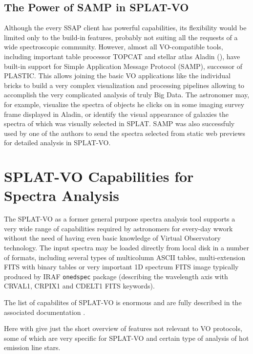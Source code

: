 \documentclass[final,authoryear,5p,times,twocolumn]{elsarticle}
\begin{document}

\subsection{The Power of SAMP in SPLAT-VO}

Although the every SSAP client has  powerful capabilities, its flexibility
would be limited only to the build-in features, probably not suiting all the
requests of a wide spectroscopic community. However, almost all VO-compatible
tools, including important table processor TOPCAT and stellar atlas
Aladin (),
have built-in support for Simple Application Message Protocol (SAMP), successor
of PLASTIC.  This allows joining the basic VO applications like the individual
bricks to build a very complex visualization and processing pipelines allowing
to accomplish the very complicated analysis of truly Big Data.  The astronomer
may, for example, visualize the spectra of objects he clicks on in some imaging
survey frame displayed in Aladin, or identify the visual appearance of galaxies
the spectra of which was visually selected in SPLAT.  SAMP was also successfuly
used by one of the authors to send the spectra selected from   static web
previews for detailed analysis in SPLAT-VO.


\section{SPLAT-VO Capabilities  for Spectra Analysis}

The SPLAT-VO as a former general purpose spectra analysis tool supports a very
wide range of capabilities required by astronomers for every-day wwork without
the need of having even basic knowledge of Virtual Observatory technology. The
input spectra may be loaded directly from local disk in a number of formats,
including several types of multicolumn ASCII tables, multi-extension FITS with
binary tables or very important 1D spectrum FITS image typically produced by
IRAF {\tt onedspec} package (describing the wavelength axis with CRVAL1, CRPIX1
and CDELT1 FITS keywords).

The list of capabilites of SPLAT-VO is enormous and are fully described in
the associated documentation \citep[SUN/243;][]{sun243}.

Here with give just the short overview of features not relevant to VO
protocols, some of which are very
specific for SPLAT-VO and certain type of analysis of hot emission line stars.
\end{document}
